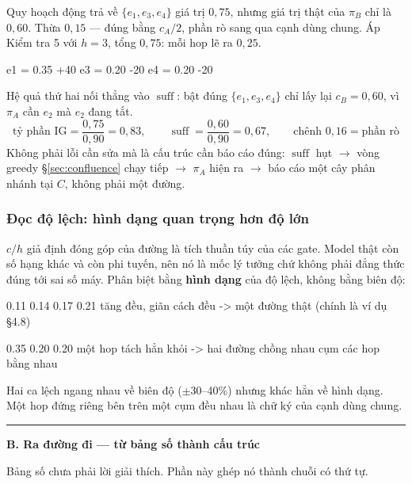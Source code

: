 \documentclass[11pt,a4paper]{article}
\DeclareMathOperator{\suff}{suff}
\begin{document}
Quy hoạch động trả về $\{e_1,e_3,e_4\}$ giá trị $0{,}75$, nhưng giá trị thật của $\pi_B$ chỉ
là $0{,}60$. Thừa $0{,}15$ --- đúng bằng $c_A/2$, phần rò sang qua cạnh dùng chung. Áp Kiểm
tra 5 với $h=3$, tổng $0{,}75$: mỗi hop lẽ ra $0{,}25$.

\begin{dia}
e1  =  0.35    +40%
e3  =  0.20    -20%
e4  =  0.20    -20%
\end{dia}

Hệ quả thứ hai nối thẳng vào $\suff$: bật đúng $\{e_1,e_3,e_4\}$ chỉ lấy lại $c_B=0{,}60$,
vì $\pi_A$ cần $e_2$ mà $e_2$ đang tắt.
\[ \text{tỷ phần IG}=\frac{0{,}75}{0{,}90}=0{,}83,
   \qquad \suff=\frac{0{,}60}{0{,}90}=0{,}67,
   \qquad \text{chênh } 0{,}16=\text{phần rò} \]
Không phải lỗi cần sửa mà là cấu trúc cần báo cáo đúng: $\suff$ hụt $\to$ vòng greedy
\S\ref{sec:confluence} chạy tiếp $\to$ $\pi_A$ hiện ra $\to$ báo cáo một cây phân nhánh tại
$C$, không phải một đường.

\subsubsection*{Đọc độ lệch: hình dạng quan trọng hơn độ lớn}

$c/h$ giả định đóng góp của đường là tích thuần túy của các gate. Model thật còn số hạng
khác và còn phi tuyến, nên nó là mốc lý tưởng chứ không phải đẳng thức đúng tới sai số máy.
Phân biệt bằng \textbf{hình dạng} của độ lệch, không bằng biên độ:

\begin{dia}
0.11  0.14  0.17  0.21     tăng đều, giãn cách đều    ->  một đường thật
                                                          (chính là ví dụ §4.8)

0.35  0.20  0.20           một hop tách hẳn khỏi      ->  hai đường chồng nhau
                           cụm các hop bằng nhau
\end{dia}

Hai ca lệch ngang nhau về biên độ ($\pm$30--40\%) nhưng khác hẳn về hình dạng. Một hop đứng
riêng bên trên một cụm đều nhau là chữ ký của cạnh dùng chung.

\bigskip\noindent\rule{\linewidth}{0.8pt}\par\smallskip
\noindent\textbf{B. Ra đường đi --- từ bảng số thành cấu trúc}

Bảng số chưa phải lời giải thích. Phần này ghép nó thành chuỗi có thứ tự.
\end{document}
